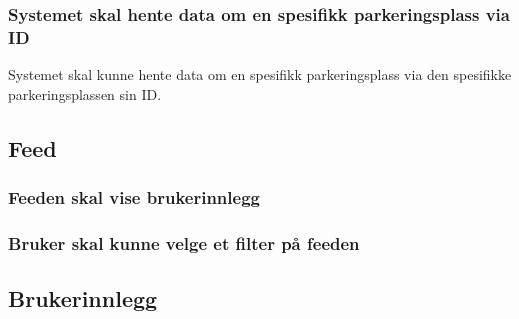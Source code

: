 \documentclass[12pt]{article}
\begin{document}
\subsubsection{Systemet skal hente data om en spesifikk parkeringsplass via ID}
Systemet skal kunne hente data om en spesifikk parkeringsplass via den spesifikke parkeringsplassen sin ID.

\subsection{Feed}

\subsubsection{Feeden skal vise brukerinnlegg}

\subsubsection{Bruker skal kunne velge et filter på feeden}

\subsection{Brukerinnlegg}
\end{document}

